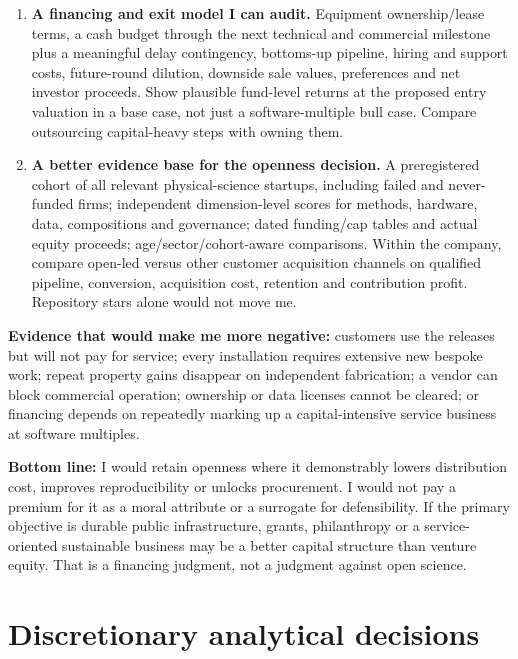 \documentclass{article}
\begin{document}
\begin{enumerate}
  only where legally permitted. Do not assume an award can be
  renegotiated after taking the money.
\item
  \textbf{A financing and exit model I can audit.} Equipment
  ownership/lease terms, a cash budget through the next technical and
  commercial milestone plus a meaningful delay contingency, bottoms-up
  pipeline, hiring and support costs, future-round dilution, downside
  sale values, preferences and net investor proceeds. Show plausible
  fund-level returns at the proposed entry valuation in a base case, not
  just a software-multiple bull case. Compare outsourcing capital-heavy
  steps with owning them.
\item
  \textbf{A better evidence base for the openness decision.} A
  preregistered cohort of all relevant physical-science startups,
  including failed and never-funded firms; independent dimension-level
  scores for methods, hardware, data, compositions and governance; dated
  funding/cap tables and actual equity proceeds; age/sector/cohort-aware
  comparisons. Within the company, compare open-led versus other
  customer acquisition channels on qualified pipeline, conversion,
  acquisition cost, retention and contribution profit. Repository stars
  alone would not move me.
\end{enumerate}

\textbf{Evidence that would make me more negative:} customers use the
releases but will not pay for service; every installation requires
extensive new bespoke work; repeat property gains disappear on
independent fabrication; a vendor can block commercial operation;
ownership or data licenses cannot be cleared; or financing depends on
repeatedly marking up a capital-intensive service business at software
multiples.

\textbf{Bottom line:} I would retain openness where it demonstrably
lowers distribution cost, improves reproducibility or unlocks
procurement. I would not pay a premium for it as a moral attribute or a
surrogate for defensibility. If the primary objective is durable public
infrastructure, grants, philanthropy or a service-oriented sustainable
business may be a better capital structure than venture equity. That is
a financing judgment, not a judgment against open science.

\clearpage
\section{Discretionary analytical
decisions}\label{discretionary-analytical-decisions}
\end{document}
